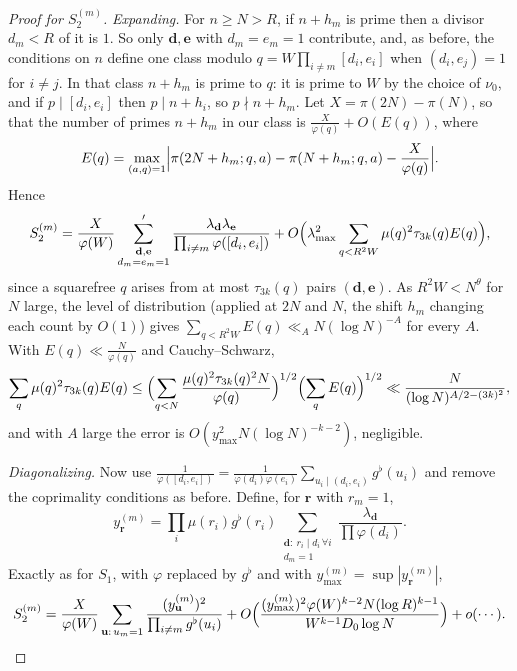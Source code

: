 \begin{proof}[Proof for $S_2^{(m)}$]
\emph{Expanding.} For $n\ge N>R$, if $n+h_m$ is prime then a divisor $d_m<R$ of it is $1$. So only $\mathbf d,\mathbf e$ with $d_m=e_m=1$ contribute, and, as before, the conditions on $n$ define one class modulo $q=W\prod_{i\ne m}[d_i,e_i]$ when $(d_i,e_j)=1$ for $i\ne j$. In that class $n+h_m$ is prime to $q$: it is prime to $W$ by the choice of $\nu_0$, and if $p\mid[d_i,e_i]$ then $p\mid n+h_i$, so $p\nmid n+h_m$. Let $X=\pi(2N)-\pi(N)$, so that the number of primes $n+h_m$ in our class is $\frac X{\varphi(q)}+O(E(q))$, where
\[
E(q)=\max_{(a,q)=1}\Bigl|\pi(2N+h_m;q,a)-\pi(N+h_m;q,a)-\frac X{\varphi(q)}\Bigr|.
\]
Hence
\[
S_2^{(m)}=\frac X{\varphi(W)}\sum^{\prime}_{\substack{\mathbf d,\mathbf e\\d_m=e_m=1}}\frac{\lambda_{\mathbf d}\lambda_{\mathbf e}}{\prod_{i\ne m}\varphi([d_i,e_i])}+O\Bigl(\lambda_{\max}^2\sum_{q<R^2W}\mu(q)^2\tau_{3k}(q)E(q)\Bigr),
\]
since a squarefree $q$ arises from at most $\tau_{3k}(q)$ pairs $(\mathbf d,\mathbf e)$. As $R^2W<N^\theta$ for $N$ large, the level of distribution (applied at $2N$ and $N$, the shift $h_m$ changing each count by $O(1)$) gives $\sum_{q<R^2W}E(q)\ll_AN(\log N)^{-A}$ for every $A$. With $E(q)\ll\frac N{\varphi(q)}$ and Cauchy--Schwarz,
\[
\sum_q\mu(q)^2\tau_{3k}(q)E(q)\le\Bigl(\sum_{q<N}\frac{\mu(q)^2\tau_{3k}(q)^2N}{\varphi(q)}\Bigr)^{1/2}\Bigl(\sum_qE(q)\Bigr)^{1/2}\ll\frac N{(\log N)^{A/2-(3k)^2}},
\]
and with $A$ large the error is $O(y_{\max}^2N(\log N)^{-k-2})$, negligible.

\emph{Diagonalizing.} Now use $\frac1{\varphi([d_i,e_i])}=\frac1{\varphi(d_i)\varphi(e_i)}\sum_{u_i\mid(d_i,e_i)}g^\flat(u_i)$ and remove the coprimality conditions as before. Define, for $\mathbf r$ with $r_m=1$,
\[
y^{(m)}_{\mathbf r}=\prod_i\mu(r_i)g^\flat(r_i)\sum_{\substack{\mathbf d:\ r_i\mid d_i\,\forall i\\d_m=1}}\frac{\lambda_{\mathbf d}}{\prod\varphi(d_i)}.
\]
Exactly as for $S_1$, with $\varphi$ replaced by $g^\flat$ and with $y^{(m)}_{\max}=\sup|y^{(m)}_{\mathbf r}|$,
\[
S_2^{(m)}=\frac X{\varphi(W)}\sum_{\mathbf u:\,u_m=1}\frac{(y^{(m)}_{\mathbf u})^2}{\prod_{i\ne m}g^\flat(u_i)}+O\Bigl(\frac{(y^{(m)}_{\max})^2\varphi(W)^{k-2}N(\log R)^{k-1}}{W^{k-1}D_0\log N}\Bigr)+o(\cdots).
\]


\end{proof}
